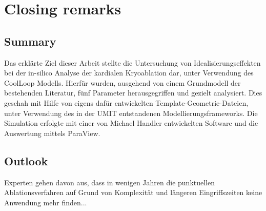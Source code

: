 \chapter{Closing remarks}
\label{sec:ClosingRemarks}
\section{Summary}
\label{sec:09_Summary}
Das erklärte Ziel dieser Arbeit stellte die Untersuchung von Idealisierungseffekten bei der in-silico Analyse der kardialen Kryoablation dar, unter Verwendung des CoolLoop Modells. Hierfür wurden, ausgehend von einem Grundmodell der bestehenden Literatur, fünf Parameter herausgegriffen und gezielt analysiert. Dies geschah mit Hilfe von eigens dafür entwickelten Template-Geometrie-Dateien, unter Verwendung des in der UMIT entstandenen Modellierungsframeworks. Die Simulation erfolgte mit einer von Michael Handler entwickelten Software und die Auswertung mittels ParaView.

\section{Outlook}
\label{sec:09_Outlook}
Experten gehen davon aus, dass in wenigen Jahren die punktuellen Ablationsverfahren auf Grund von Komplexit{\"a}t und l{\"a}ngeren Eingriffszeiten keine Anwendung mehr finden...